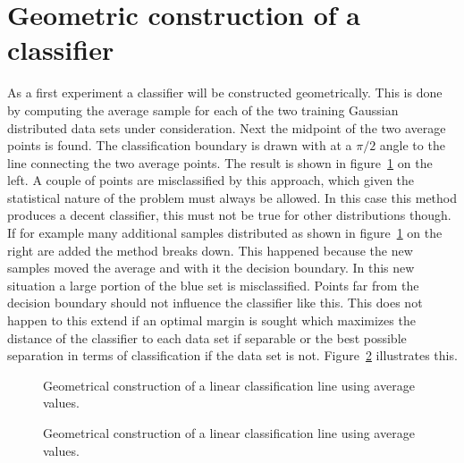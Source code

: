 \section{Geometric construction of a classifier}
As a first experiment a classifier will be constructed geometrically. This is done by computing the average sample for each of the two training Gaussian distributed data sets under consideration. Next the midpoint of the two average points is found. The classification boundary is drawn with at a $\pi/2$ angle to the line connecting the two average points. The result is shown in figure~\ref{fig:initGauss} on the left. A couple of points are misclassified by this approach, which given the statistical nature of the problem must always be allowed. In this case this method produces a decent classifier, this must not be true for other distributions though. If for example many additional samples distributed as shown in figure~\ref{fig:initGauss} on the right are added the method breaks down. This happened because the new samples moved the average and with it the decision boundary. In this new situation a large portion of the blue set is misclassified. 
Points far from the decision boundary should not influence the classifier like this. This does not happen to this extend if an optimal margin is sought which maximizes the distance of the classifier to each data set if separable or the best possible separation in terms of classification if the data set is not. Figure~\ref{fig:initGaussSvm} illustrates this.
\begin{figure}


\caption{Geometrical construction of a linear classification line using average values.}
\label{fig:initGauss}
\end{figure}
\begin{figure}


\caption{Geometrical construction of a linear classification line using average values.}
\label{fig:initGaussSvm}
\end{figure}

